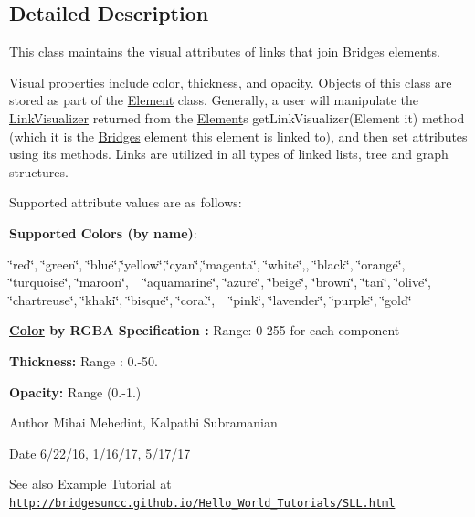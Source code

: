 \subsection{Detailed Description}
This class maintains the visual attributes of links that join \mbox{\hyperlink{namespace_bridges_1_1_bridges}{Bridges}} elements. 

Visual properties include color, thickness, and opacity. Objects of this class are stored as part of the \mbox{\hyperlink{namespace_bridges_1_1_element}{Element}} class. Generally, a user will manipulate the \mbox{\hyperlink{class_bridges_1_1_link_visualizer_1_1_link_visualizer}{Link\+Visualizer}} returned from the \mbox{\hyperlink{namespace_bridges_1_1_element}{Element}}\textquotesingle{}s get\+Link\+Visualizer(\+Element it) method (which it is the \mbox{\hyperlink{namespace_bridges_1_1_bridges}{Bridges}} element this element is linked to), and then set attributes using its methods. Links are utilized in all types of linked lists, tree and graph structures.

Supported attribute values are as follows\+:

{\bfseries Supported Colors (by name)}\+: 

\char`\"{}red\char`\"{}, \char`\"{}green\char`\"{}, \char`\"{}blue\char`\"{},\char`\"{}yellow\char`\"{},\char`\"{}cyan\char`\"{},\char`\"{}magenta\char`\"{}, \char`\"{}white\char`\"{},, \char`\"{}black\char`\"{}, \char`\"{}orange\char`\"{}, \char`\"{}turquoise\char`\"{}, \char`\"{}maroon\char`\"{}, ~\newline
 \char`\"{}aquamarine\char`\"{}, \char`\"{}azure\char`\"{}, \char`\"{}beige\char`\"{}, \char`\"{}brown\char`\"{}, \char`\"{}tan\char`\"{}, \char`\"{}olive\char`\"{}, \char`\"{}chartreuse\char`\"{}, \char`\"{}khaki\char`\"{}, \char`\"{}bisque\char`\"{}, \char`\"{}coral\char`\"{}, ~\newline
 \char`\"{}pink\char`\"{}, \char`\"{}lavender\char`\"{}, \char`\"{}purple\char`\"{}, \char`\"{}gold\char`\"{} 

{\bfseries  \mbox{\hyperlink{namespace_bridges_1_1_color}{Color}} by R\+G\+BA Specification \+:} Range\+: 0-\/255 for each component 

{\bfseries  Thickness\+: } Range \+: 0.-\/50.

{\bfseries  Opacity\+: } Range (0.-\/1.) 

\begin{DoxyAuthor}{Author}
Mihai Mehedint, Kalpathi Subramanian
\end{DoxyAuthor}
\begin{DoxyDate}{Date}
6/22/16, 1/16/17, 5/17/17
\end{DoxyDate}
\begin{DoxySeeAlso}{See also}
Example Tutorial at ~\newline
 \href{http://bridgesuncc.github.io/Hello_World_Tutorials/SLL.html}{\tt http\+://bridgesuncc.\+github.\+io/\+Hello\+\_\+\+World\+\_\+\+Tutorials/\+S\+L\+L.\+html} 
\end{DoxySeeAlso}


